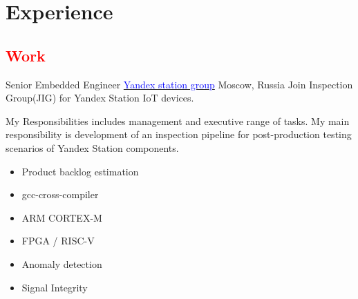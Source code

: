 \section{Experience}

\vspace{2mm}
\subsection{\Large{\textcolor{red}{Work}}}


        {Senior Embedded Engineer}
        {\href{https://sdg.yandex.com/}{\textcolor{blue}{Yandex station group}}}
        {Moscow, Russia}
        {
        \newline
        Join Inspection Group(JIG) for Yandex Station IoT devices.
        }{My Responsibilities includes management and executive range of tasks. My main responsibility is development of an inspection pipeline for post-production testing scenarios of Yandex Station components.
        \begin{itemize}
            \item Product backlog estimation
            \item gcc-cross-compiler
            \item ARM CORTEX-M 
            \item FPGA / RISC-V
            \item Anomaly detection
            \item Signal Integrity 
        \end{itemize}
        }
        
